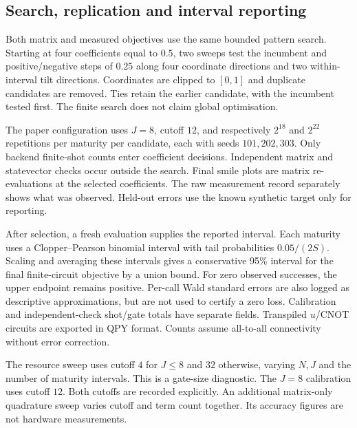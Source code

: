 \subsection{Search, replication and interval reporting}
Both matrix and measured objectives use the same bounded pattern search.
Starting at four coefficients equal to $0.5$, two sweeps test the incumbent
and positive/negative steps of $0.25$ along four coordinate directions and
two within-interval tilt directions. Coordinates are clipped to $[0,1]$ and
duplicate candidates are removed. Ties retain the earlier candidate, with
the incumbent tested first. The finite search does not claim global optimisation.

The paper configuration uses $J=8$, cutoff $12$, and respectively $2^{18}$
and $2^{22}$ repetitions per maturity per candidate, each with seeds
$101,202,303$. Only backend finite-shot counts enter coefficient decisions.
Independent matrix and statevector checks occur outside the search.
Final smile plots are matrix re-evaluations at the selected coefficients.
The raw measurement record separately shows what was observed. Held-out
errors use the known synthetic target only for reporting.

After selection, a fresh evaluation supplies the reported interval. Each
maturity uses a Clopper--Pearson binomial interval with tail probabilities
$0.05/(2S)$. Scaling and averaging these intervals gives a conservative
95\% interval for the final finite-circuit objective by a union bound.
For zero observed successes, the upper endpoint remains positive. Per-call
Wald standard errors are also logged as descriptive approximations, but are
not used to certify a zero loss. Calibration and independent-check shot/gate
totals have separate fields. Transpiled $u$/CNOT circuits are exported
in QPY format. Counts assume all-to-all connectivity without error correction.

The resource sweep uses cutoff $4$ for $J\leq8$ and $32$ otherwise, varying
$N,J$ and the number of maturity intervals. This is a gate-size diagnostic.
The $J=8$ calibration uses cutoff $12$. Both cutoffs are recorded explicitly.
An additional matrix-only quadrature sweep varies cutoff and term count
together. Its accuracy figures are not hardware measurements.
